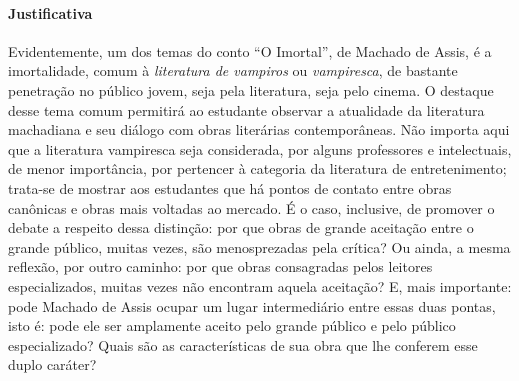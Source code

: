 \documentclass{extarticle}
\begin{document}
\paragraph{Justificativa} Evidentemente, um dos temas do conto ``O
Imortal'', de Machado de Assis, é a imortalidade, comum à
\emph{literatura de vampiros} ou \emph{vampiresca}, de bastante
penetração no público jovem, seja pela literatura, seja pelo cinema. O
destaque desse tema comum permitirá ao estudante observar a atualidade
da literatura machadiana e seu diálogo com obras literárias
contemporâneas. Não importa aqui que a literatura vampiresca seja
considerada, por alguns professores e intelectuais, de menor
importância, por pertencer à categoria da literatura de entretenimento;
trata-se de mostrar aos estudantes que há pontos de contato entre obras
canônicas e obras mais voltadas ao mercado. É o caso, inclusive, de
promover o debate a respeito dessa distinção: por que obras de grande
aceitação entre o grande público, muitas vezes, são menosprezadas pela
crítica? Ou ainda, a mesma reflexão, por outro caminho: por que obras
consagradas pelos leitores especializados, muitas vezes não encontram
aquela aceitação? E, mais importante: pode Machado de Assis ocupar um
lugar intermediário entre essas duas pontas, isto é: pode ele ser
amplamente aceito pelo grande público e pelo público especializado?
Quais são as características de sua obra que lhe conferem esse duplo
caráter?
\end{document}
